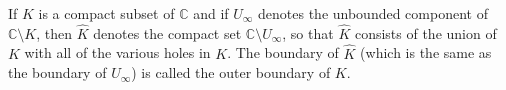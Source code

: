 If $K$ is a compact subset of $\mathbb{C}$ and if $U_{\infty}$ denotes the unbounded component of $\mathbb{C} \setminus K$, then $\hat{K}$ denotes the compact set $\mathbb{C} \setminus U_{\infty}$, so that $\hat{K}$ consists of the union of $K$ with all of the various holes in $K$. The boundary of $\hat{K}$ (which is the same as the boundary of $U_{\infty}$) is called the outer boundary of $K$.
